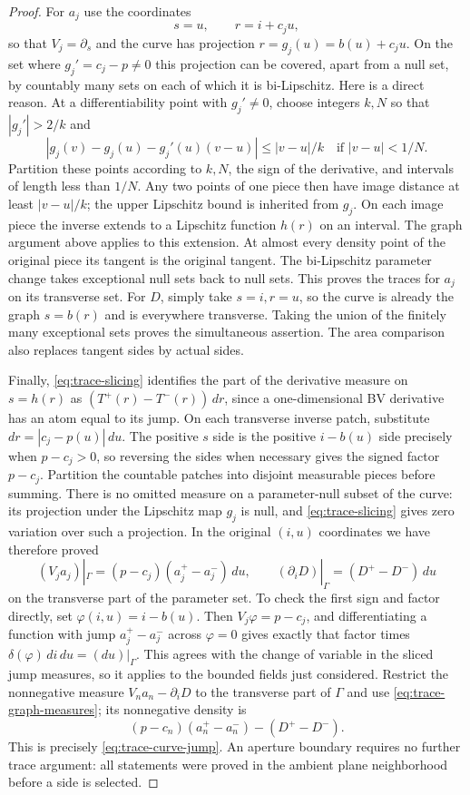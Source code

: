 \begin{proof}
For $a_j$ use the coordinates
\[
 s=u,\qquad r=i+c_ju,
\]
so that $V_j=\partial_s$ and the curve has projection
$r=g_j(u)=b(u)+c_ju$.  On the set where $g_j'=c_j-p\ne0$ this
projection can be covered, apart from a null set, by countably many
sets on each of which it is bi-Lipschitz.  Here is a direct reason.
At a differentiability point with $g_j'\ne0$, choose integers $k,N$
so that $|g_j'|>2/k$ and
\[
 |g_j(v)-g_j(u)-g_j'(u)(v-u)|\le |v-u|/k
 \quad\text{if }|v-u|<1/N.
\]
Partition these points according to $k,N$, the sign of the derivative,
and intervals of length less than $1/N$.  Any two points of one piece
then have image distance at least $|v-u|/k$; the upper Lipschitz bound
is inherited from $g_j$.  On each image piece the inverse extends
to a Lipschitz function $h(r)$ on an interval.  The graph argument
above applies to this extension.  At almost every density point of
the original piece its tangent is the original tangent.  The
bi-Lipschitz parameter change takes exceptional null sets back to
null sets.  This proves the traces for $a_j$ on its transverse set.
For $D$, simply take $s=i,r=u$, so the curve is already the graph
$s=b(r)$ and is everywhere transverse.  Taking the union of the
finitely many exceptional sets proves the simultaneous assertion.
The area comparison also replaces tangent sides by actual sides.

Finally, \eqref{eq:trace-slicing} identifies the part of the derivative
measure on $s=h(r)$ as $(T^+(r)-T^-(r))\,dr$, since a
one-dimensional BV derivative has an atom equal to its jump.
On each transverse inverse patch, substitute
$dr=|c_j-p(u)|\,du$.  The positive $s$ side is the positive $i-b(u)$
side precisely when $p-c_j>0$, so reversing the sides when necessary
gives the signed factor $p-c_j$.  Partition the countable patches
into disjoint measurable pieces before summing.  There is no omitted
measure on a parameter-null subset of the curve: its projection under
the Lipschitz map $g_j$ is null, and \eqref{eq:trace-slicing} gives zero
variation over such a projection.  In the original $(i,u)$ coordinates
we have therefore proved
\begin{equation}\label{eq:trace-graph-measures}
 (V_ja_j)|_\Gamma
   =(p-c_j)(a_j^+-a_j^-)\,du,
 \qquad
 (\partial_iD)|_\Gamma=(D^+-D^-)\,du
\end{equation}
on the transverse part of the parameter set.  To check the first
sign and factor directly, set $\varphi(i,u)=i-b(u)$.  Then
$V_j\varphi=p-c_j$, and differentiating a function with jump
$a_j^+-a_j^-$ across $\varphi=0$ gives exactly that factor times
$\delta(\varphi)\,di\,du=(du)|_\Gamma$.
This agrees with the change of variable in the sliced jump measures,
so it applies to the bounded fields just considered.  Restrict the
nonnegative measure $V_na_n-\partial_iD$ to the transverse part of
$\Gamma$ and use
\eqref{eq:trace-graph-measures}; its nonnegative density is
\[
 (p-c_n)(a_n^+-a_n^-)-(D^+-D^-).
\]
This is precisely \eqref{eq:trace-curve-jump}.  An aperture boundary
requires no further trace argument: all statements were proved in
the ambient plane neighborhood before a side is selected.
\end{proof}
